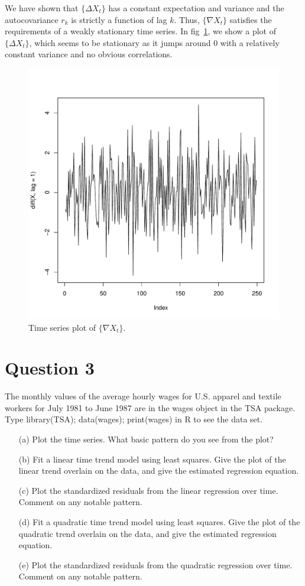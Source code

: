 \documentclass[10pt]{fphw}
\theoremstyle{definition}
\begin{document}
\begin{enumerate}
We have shown that $\{\Delta X_t\}$ has a constant expectation and variance and the autocovariance $r_k$ is strictly a function of lag $k$.
Thus, $\{\nabla X_t\}$ satisfies the requirements of a weakly stationary time series. In fig~\ref{fig:plot2d}, we show a plot of $\{\Delta X_t\}$,
which seems to be stationary as it jumps around $0$ with a relatively constant variance and no obvious correlations.
\begin{figure}[h]
    \centering
    \includegraphics[width=.29\linewidth]{plot2_d}
    \caption{Time series plot of $\{\nabla X_t\}$.}
    \label{fig:plot2d}
\end{figure}
\end{enumerate}


\newpage
\section*{Question 3}
\begin{problem}
The monthly values of the average hourly wages for U.S. apparel and textile workers for July
1981 to June 1987 are in the wages object in the TSA package. Type library(TSA); data(wages);
print(wages) in R to see the data set.
\begin{enumerate}
\item[(a)] Plot the time series. What basic pattern do you see from the plot?
\item[(b)] Fit a linear time trend model using least squares. Give the plot of the linear trend overlain on the
data, and give the estimated regression equation.
\item[(c)] Plot the standardized residuals from the linear regression over time. Comment on any notable
pattern.
\item[(d)] Fit a quadratic time trend model using least squares. Give the plot of the quadratic trend overlain
on the data, and give the estimated regression equation.
\item[(e)] Plot the standardized residuals from the quadratic regression over time. Comment on any notable
pattern.
\end{enumerate}
\end{problem}
\end{document}
